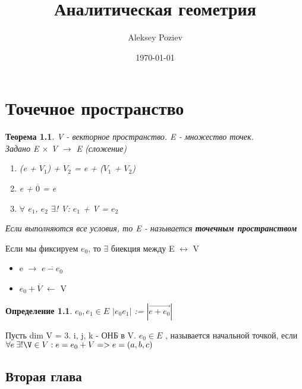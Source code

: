 \documentclass[a4paper, 14pt]{report}
\author{Aleksey Poziev}
\title{Аналитическая геометрия}
\date{\today}
\begin{document}
	\maketitle
\tableofcontents{}
\clearpage

\newtheorem{thm}{Теорема} 
\newtheorem{defin}{Определение}

\chapter{Точечное пространство}

\begin{thm}
	V - векторное пространство. E - множество точек. \\
	Задано E $\times$ V $\rightarrow$ E (сложение)\\
	\begin{enumerate}
		\item (e + $V_1$) + $V_2$ = e + ($V_1$ + $V_2$)
		\item e + $\overline{0}$ = e
		\item $\forall$ $e_1$, $e_2$  $\exists$! V:  $e_1$ + V = $e_2$
	\end{enumerate}
	Если выполняются все условия, то E - называется \textbf{точечным пространством}
\end{thm}
Если мы фиксируем $e_0$, то $\exists$ биекция между E $\leftrightarrow$ V
\begin{itemize}
	\item e $\rightarrow$ $\overline{e - e_0}$ 
	\item $e_0 + \overline{V}$ $\leftarrow$ V
\end{itemize}

\begin{defin}
	$e_0, e_1 \in E$ $|e_0e_1|$ := $|\overrightarrow{e + e_0}|$
\end{defin}
Пусть dim V = 3. i, j, k - ОНБ  в V. $e_0 \in E$ , называется начальной точкой, если $\forall e \: \exists! \V \in V: e = e_0 + V => e = (a, b, c)$
\section{Вторая глава}

	
\end{document}
